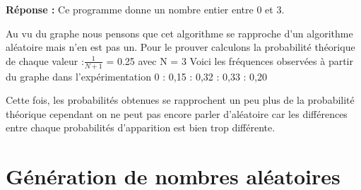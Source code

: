 \documentclass[oneside]{book}
\begin{document}
\textbf{Réponse :} \newline
Ce programme donne un nombre entier entre 0 et 3.

Au vu du graphe nous pensons que cet algorithme se rapproche d'un algorithme aléatoire mais n'en est pas un. Pour le prouver calculons la probabilité théorique de chaque valeur :\newline \newline $\frac{1}{N+1}$ = 0.25 avec N = 3 \newline \newline
Voici les fréquences observées à partir du graphe dans l'expérimentation
0 : 0,15  : 0,32  : 0,33  : 0,20 \newline

Cette fois, les probabilités obtenues se rapprochent un peu plus de la probabilité théorique cependant on ne peut pas encore parler d'aléatoire car les différences entre chaque probabilités d'apparition est bien trop différente.
\section{Génération de nombres aléatoires}
\end{document}

